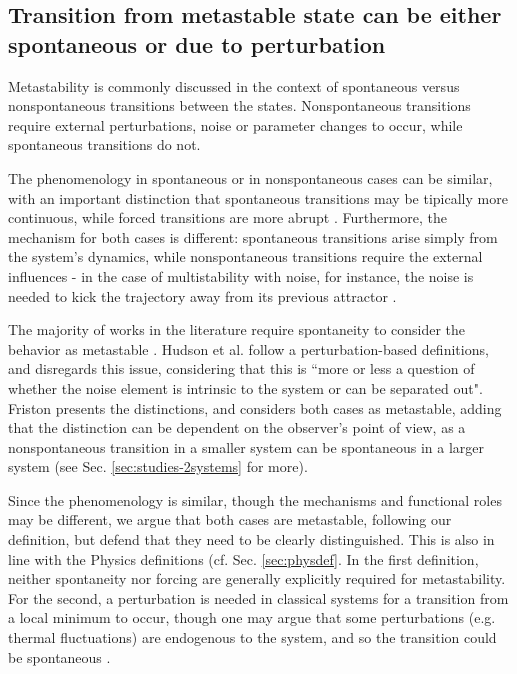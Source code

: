 \documentclass[preprint,superscriptaddress,showpacs,amsmath,amssymb,aps,pre,floatfix]{revtex4-1}
\theoremstyle{definition}
\begin{document}





\subsection{Transition from metastable state can be either spontaneous or due to perturbation}
Metastability is commonly discussed in the context of spontaneous versus nonspontaneous transitions between the states. Nonspontaneous transitions require external perturbations, noise or parameter changes to occur, while spontaneous transitions do not.

The phenomenology in spontaneous or in nonspontaneous cases can be similar, with an important distinction that spontaneous transitions may be tipically more continuous, while forced transitions are more abrupt \cite{kelso_2012}. 
Furthermore, the mechanism for both cases is different: spontaneous transitions arise simply from the system's dynamics, while nonspontaneous transitions require the external influences - in the case of multistability with noise, for instance, the noise is needed to kick the trajectory away from its previous attractor \cite{kelso_2012, kelso_2017}.

The majority of works in the literature require spontaneity to consider the behavior as metastable \cite{vasa_2015, kelso_2017, kelso_2012, hellyer_2014, shanahan_2010, deco_2017, roberts_2019, ponce-alvarez_2015, fingelkurts_2006timing}. Hudson et al. \cite{hudson_2017} follow a perturbation-based definitions, and disregards this issue, considering that this is ``more or less a question  of whether the noise element is intrinsic to the system or can be separated out".
Friston \cite{friston_2000transients} presents the distinctions, and considers both cases as metastable, adding that the distinction can be dependent on the observer's point of view, as a nonspontaneous transition in a smaller system can be spontaneous in a larger system (see Sec. \ref{sec:studies-2systems} for more). 

Since the phenomenology is similar, though the mechanisms and functional roles may be different, we argue that both cases are metastable, following our definition, but defend that they need to be clearly distinguished. This is also in line with the Physics definitions (cf. Sec. \ref{sec:physdef}. In the first definition, neither spontaneity nor forcing are generally explicitly required for metastability. For the second, a perturbation is needed in classical systems for a transition from a local minimum to occur, though one may argue that some perturbations (e.g. thermal fluctuations) are endogenous to the system, and so the transition could be spontaneous \cite{bovier_2009}. 
\end{document}
